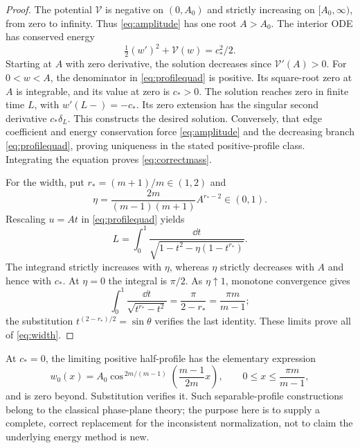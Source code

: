 \documentclass[11pt,a4paper]{article}
\theoremstyle{remark}\newtheorem{remark}[theorem]{Remark}
\begin{document}
\begin{proof}
The potential $\mathcal V$ is negative on $(0,A_0)$ and strictly increasing on $[A_0,\infty)$, from zero to infinity. Thus \eqref{eq:amplitude} has one root $A>A_0$. The interior ODE has conserved energy
\[
 \tfrac12(w')^2+\mathcal V(w)=c_*^2/2.
\]
Starting at $A$ with zero derivative, the solution decreases since $\mathcal V'(A)>0$. For $0<w<A$, the denominator in \eqref{eq:profilequad} is positive. Its square-root zero at $A$ is integrable, and its value at zero is $c_*>0$. The solution reaches zero in finite time $L$, with $w'(L-)=-c_*$. Its zero extension has the singular second derivative $c_*\delta_L$. This constructs the desired solution. Conversely, that edge coefficient and energy conservation force \eqref{eq:amplitude} and the decreasing branch \eqref{eq:profilequad}, proving uniqueness in the stated positive-profile class. Integrating the equation proves \eqref{eq:correctmass}.

For the width, put $r_*=(m+1)/m\in(1,2)$ and
\[
 \eta=\frac{2m}{(m-1)(m+1)}A^{r_*-2}\in(0,1).
\]
Rescaling $u=At$ in \eqref{eq:profilequad} yields
\[
 L=\int_0^1\frac{\dd t}{\sqrt{1-t^2-\eta(1-t^{r_*})}}.
\]
The integrand strictly increases with $\eta$, whereas $\eta$ strictly decreases with $A$ and hence with $c_*$. At $\eta=0$ the integral is $\pi/2$. As $\eta\uparrow1$, monotone convergence gives
\[
 \int_0^1\frac{\dd t}{\sqrt{t^{r_*}-t^2}}
 =\frac{\pi}{2-r_*}=\frac{\pi m}{m-1};
\]
the substitution $t^{(2-r_*)/2}=\sin\theta$ verifies the last identity. These limits prove all of \eqref{eq:width}.
\end{proof}

At $c_*=0$, the limiting positive half-profile has the elementary expression
\[
 w_0(x)=A_0\cos^{\,2m/(m-1)}\!\left(\frac{m-1}{2m}x\right),
 \qquad 0\leq x\leq\frac{\pi m}{m-1},
\]
and is zero beyond. Substitution verifies it. Such separable-profile constructions belong to the classical phase-plane theory; the purpose here is to supply a complete, correct replacement for the inconsistent normalization, not to claim the underlying energy method is new.
\end{document}
